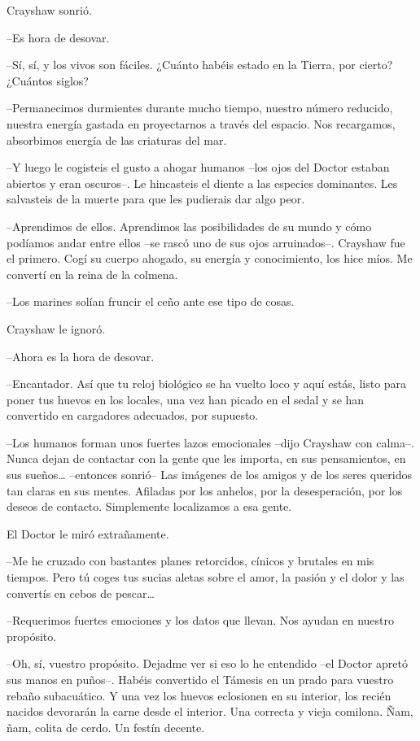 {Crayshaw sonrió.}

{--Es hora de desovar.}

{--Sí, sí, y los vivos son fáciles. ¿Cuánto habéis estado en la Tierra,
por cierto? ¿Cuántos siglos?}

{--Permanecimos durmientes durante mucho tiempo, nuestro número
 reducido, nuestra energía gastada en proyectarnos a través del espacio.
Nos recargamos, absorbimos energía de las criaturas del mar.}

{--Y luego le cogisteis el gusto a ahogar humanos --los ojos del Doctor
 estaban abiertos y eran oscuros--. Le hincasteis el diente a las
 especies dominantes. Les salvasteis de la muerte para que les pudierais
dar algo peor.}

{--Aprendimos de ellos. Aprendimos las posibilidades de su mundo y cómo
 podíamos andar entre ellos --se rascó uno de sus ojos arruinados--.
 Crayshaw fue el primero. Cogí su cuerpo ahogado, su energía y
conocimiento, los hice míos. Me convertí en la reina de la colmena.}

{--Los marines solían fruncir el ceño ante ese tipo de cosas.}

{Crayshaw le ignoró.}

{--Ahora es la hora de desovar.}

{--Encantador. Así que tu reloj biológico se ha vuelto loco y aquí
 estás, listo para poner tus huevos en los locales, una vez han picado en
el sedal y se han convertido en cargadores adecuados, por supuesto.}

{--Los humanos forman unos fuertes lazos emocionales --dijo Crayshaw con
 calma--. Nunca dejan de contactar con la gente que les importa, en sus
 pensamientos, en sus sueños\ldots{} --entonces sonrió-- Las imágenes de
 los amigos y de los seres queridos tan claras en sus mentes. Afiladas
 por los anhelos, por la desesperación, por los deseos de contacto.
Simplemente localizamos a esa gente.}

{El Doctor le miró extrañamente.}

{--Me he cruzado con bastantes planes retorcidos, cínicos y brutales en
 mis tiempos. Pero tú coges tus sucias aletas sobre el amor, la pasión y
 el dolor y las convertís en cebos de pescar\ldots{}}

{--Requerimos fuertes emociones y los datos que llevan. Nos ayudan en
nuestro propósito.}

{--Oh, sí, vuestro propósito. Dejadme ver si eso lo he entendido --el
 Doctor apretó sus manos en puños--. Habéis convertido el Támesis en un
 prado para vuestro rebaño subacuático. Y una vez los huevos eclosionen
 en su interior, los recién nacidos devorarán la carne desde el interior.
 Una correcta y vieja comilona. Ñam, ñam, colita de cerdo. Un festín
decente.}

